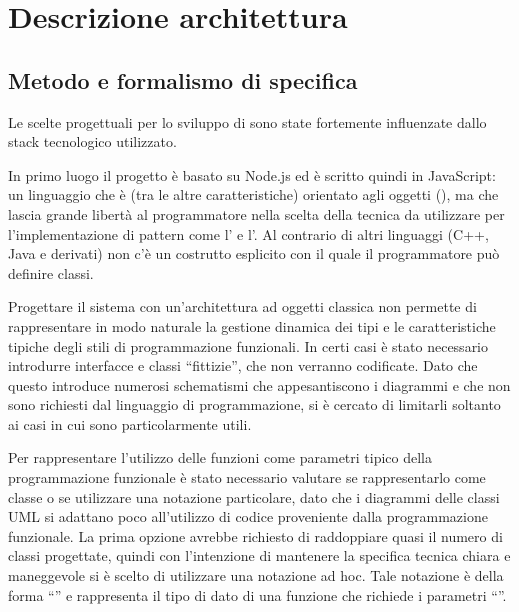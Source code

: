 \section{Descrizione architettura}

\subsection{Metodo e formalismo di specifica}

Le scelte progettuali per lo sviluppo di \ProjectName{} sono state fortemente influenzate dallo stack tecnologico utilizzato.

In primo luogo il progetto è basato su Node.js ed è scritto quindi in JavaScript: un linguaggio che è (tra le altre caratteristiche) orientato agli oggetti (), ma che lascia grande libertà al programmatore nella scelta della tecnica da utilizzare per l'implementazione di pattern come l' e l'. Al contrario di altri linguaggi (C++, Java e derivati) non c'è un costrutto esplicito con il quale il programmatore può definire classi. 

Progettare il sistema con un'architettura ad oggetti classica non permette di rappresentare in modo naturale la gestione dinamica dei tipi e le caratteristiche tipiche degli stili di programmazione funzionali. In certi casi è stato necessario introdurre interfacce e classi ``fittizie'', che non verranno codificate. Dato che questo introduce numerosi schematismi che appesantiscono i diagrammi e che non sono richiesti dal linguaggio di programmazione, si è cercato di limitarli soltanto ai casi in cui sono particolarmente utili.

Per rappresentare l'utilizzo delle funzioni come parametri tipico della programmazione funzionale è stato necessario valutare se rappresentarlo come classe o se utilizzare una notazione particolare, dato che i diagrammi delle classi UML si adattano poco all'utilizzo di codice proveniente dalla programmazione funzionale. La prima opzione avrebbe richiesto di raddoppiare quasi il numero di classi progettate, quindi con l'intenzione di mantenere la specifica tecnica chiara e maneggevole si è scelto di utilizzare una notazione ad hoc. Tale notazione è della forma ``'' e rappresenta il tipo di dato di una funzione che richiede i parametri ``''.

